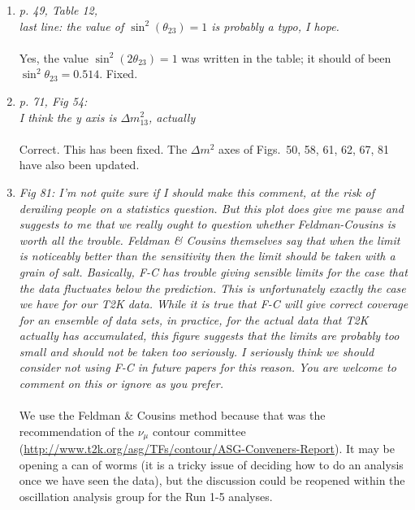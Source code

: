 \begin{enumerate}
  \vspace{5 mm}
\item
  {\em
    p. 49, Table 12,\\
    last line: the value of $\sin^2(\theta_{23})=1$ is probably a typo, I hope.
  }\\
  \\
  Yes, the value $\sin^2(2\theta_{23})=1$ was written in the table; it should of been $\sin^2\theta_{23}=0.514$. Fixed.
  
  \vspace{5 mm}
\item
  {\em
    p. 71, Fig 54:\\
    I think the y axis is $\Delta m^2_{13}$, actually
  }\\
  \\
  Correct. This has been fixed. The $\Delta m^2$ axes of Figs.\ 50, 58, 61, 62, 67, 81 have also been updated.
    
  \vspace{5 mm}
\item
  {\em
    Fig 81: I'm not quite sure if I should make this comment, at the risk of derailing people on a statistics question.  But this plot does give me pause and suggests to me that we really ought to question whether Feldman-Cousins is worth all the trouble.  Feldman \& Cousins themselves say that when the limit is noticeably better than the sensitivity then the limit should be taken with a grain of salt.  Basically, F-C has trouble giving sensible limits for the case that the data fluctuates below the prediction.  This is unfortunately exactly the case we have for our T2K data.  While it is true that F-C will give correct coverage for an ensemble of data sets, in practice, for the actual data that T2K actually has accumulated, this figure suggests that the limits are probably too small and should not be taken too seriously.  I seriously think we should consider not using F-C in future papers for this reason.  You are welcome to comment on this or ignore as you prefer.
  }\\
  \\
  We use the Feldman \& Cousins method because that was the recommendation of the $\nu_\mu$ contour committee (\url{http://www.t2k.org/asg/TFs/contour/ASG-Conveners-Report}).
  It may be opening a can of worms (it is a tricky issue of deciding how to do an analysis once we have seen the data),
  but the discussion could be reopened within the oscillation analysis group for the Run 1-5 analyses.

    
\end{enumerate}
  

